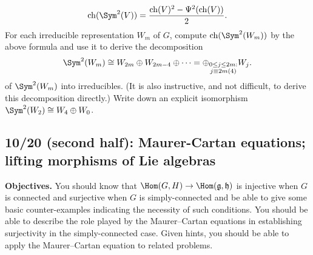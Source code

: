 \documentclass[reqno]{amsart} 
\begin{document}
\begin{homework}
\begin{enumerate}
\begin{enumerate}
\begin{equation*}
      \operatorname{ch}(\Sym^2(V))
      = \frac{\operatorname{ch}(V)^2 - \Psi^2(\operatorname{ch}(V))}{2}.
    \end{equation*}
    For each irreducible
    representation $W_m$ of $G$,
    compute
    $\operatorname{ch}(\Sym^2(W_m))$
    by the above formula and use it to
    derive
    the decomposition
    \begin{equation*}
      \Sym^2(W_m)
      \cong
      W_{2 m} \oplus W_{2 m - 4} \oplus \dotsb
      = \oplus _{\substack{
          0 \leq j \leq 2 m : \\
          j \equiv 2 m (4)
        }}
      W_j.
    \end{equation*}
    of $\Sym^2(W_m)$ into irreducibles.
    (It is also instructive, and not difficult,
    to derive this decomposition directly.)
    Write down an explicit isomorphism $\Sym^2(W_2) \cong W_4 \oplus W_0$.
  \end{enumerate}
  \end{enumerate}
\end{homework}

\subsection{10/20 (second half): Maurer-Cartan equations; lifting morphisms of Lie algebras}
\label{sec:org5473899}
\textbf{Objectives.} You should know that \(\Hom(G,H) \rightarrow
\Hom(\mathfrak{g},\mathfrak{h})\) is injective when \(G\) is connected
and surjective when \(G\) is simply-connected and be able to give some
basic counter-examples indicating the necessity of such conditions.
You should be able to describe the role played by the Maurer--Cartan
equations in establishing surjectivity in the simply-connected case.
Given hints, you should be able to apply the Maurer--Cartan equation to related
problems.
\end{document}
